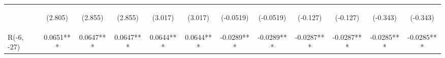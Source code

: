 \documentclass[]{article}
\begin{document}
\begin{center}
\begin{tabular}{lccccccccccc}
        \vspace{4pt}     & \begin{footnotesize}(2.805)\end{footnotesize}  & \begin{footnotesize}(2.855)\end{footnotesize}  & \begin{footnotesize}(2.855)\end{footnotesize}  & \begin{footnotesize}(3.017)\end{footnotesize}  & \begin{footnotesize}(3.017)\end{footnotesize}  & \begin{footnotesize}(-0.0519)\end{footnotesize} & \begin{footnotesize}(-0.0519)\end{footnotesize} & \begin{footnotesize}(-0.127)\end{footnotesize} & \begin{footnotesize}(-0.127)\end{footnotesize} & \begin{footnotesize}(-0.343)\end{footnotesize} & \begin{footnotesize}(-0.343)\end{footnotesize} \\
        R(-6, -27)       & 0.0651***                                      & 0.0647***                                      & 0.0647***                                      & 0.0644***                                      & 0.0644***                                      & -0.0289***                                      & -0.0289***                                      & -0.0287***                                     & -0.0287***                                     & -0.0285***                                     & -0.0285***                                     \\

\end{tabular}
\end{center}
\end{document}
